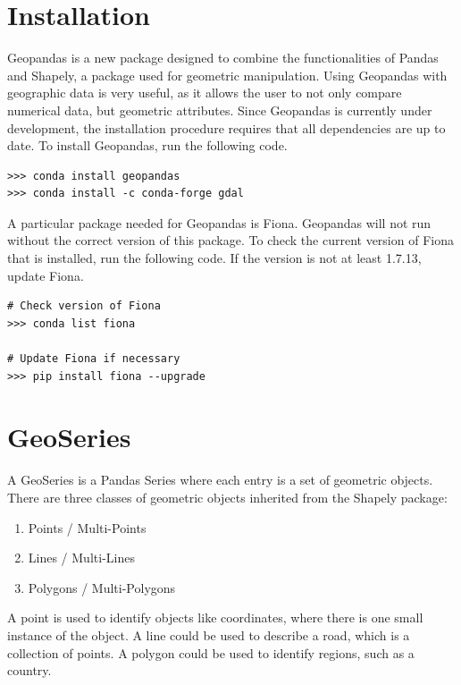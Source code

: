 


\section*{Installation}
Geopandas is a new package designed to combine the functionalities of Pandas and Shapely, a package used for geometric manipulation.
Using Geopandas with geographic data is very useful, as it allows the user to not only compare numerical data, but geometric attributes.
Since Geopandas is currently under development, the installation procedure requires that all dependencies are up to date. 
To install Geopandas, run the following code.

\begin{lstlisting}
>>> conda install geopandas
>>> conda install -c conda-forge gdal
\end{lstlisting}

A particular package needed for Geopandas is Fiona.
Geopandas will not run without the correct version of this package.
To check the current version of Fiona that is installed, run the following code.
If the version is not at least 1.7.13, update Fiona.

\begin{lstlisting}
# Check version of Fiona
>>> conda list fiona

# Update Fiona if necessary
>>> pip install fiona --upgrade
\end{lstlisting}

\section*{GeoSeries}

A GeoSeries is a Pandas Series where each entry is a set of geometric objects.
There are three classes of geometric objects inherited from the Shapely package:
\begin{enumerate}
\item Points / Multi-Points
\item Lines / Multi-Lines
\item Polygons / Multi-Polygons
\end{enumerate}
A point is used to identify objects like coordinates, where there is one small instance of the object.
A line could be used to describe a road, which is a collection of points.
A polygon could be used to identify regions, such as a country.

